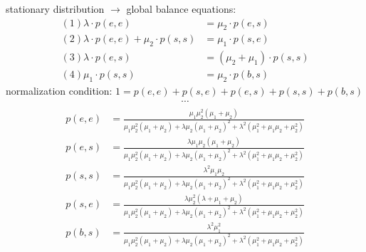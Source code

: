 stationary distribution $\rightarrow$ global balance equations:
\begin{align*}
\left(1\right)\lambda \cdot p\left(e,e\right)&=\mu _{2}\cdot p\left(e,s\right)\\
\left(2\right)\lambda \cdot p\left(e,e\right)+\mu _{2}\cdot p\left(s,s\right)&=\mu _{1}\cdot p\left(s,e\right)\\
\left(3\right)\lambda \cdot p\left(e,s\right)&=\left(\mu _{2}+\mu _{1}\right)\cdot p\left(s,s\right)\\
\left(4\right)\mu _{1}\cdot p\left(s,s\right)&=\mu _{2}\cdot p\left(b,s\right)
\end{align*}
normalization condition: $1=p\left(e,e\right)+p\left(s,e\right)+p\left(e,s\right)+p\left(s,s\right)+p\left(b,s\right)$
\begin{align*}
\cdots
\end{align*}
\begin{align*}
p ( e , e ) &= \frac { \mu _ { 1 } \mu _ { 2 } ^ { 2 } \left( \mu _ { 1 } + \mu _ { 2 } \right) } { \mu _ { 1 } \mu _ { 2 } ^ { 2 } \left( \mu _ { 1 } + \mu _ { 2 } \right) + \lambda \mu _ { 2 } \left( \mu _ { 1 } + \mu _ { 2 } \right) ^ { 2 } + \lambda ^ { 2 } \left( \mu _ { 1 } ^ { 2 } + \mu _ { 1 } \mu _ { 2 } + \mu _ { 2 } ^ { 2 } \right) }\\
p ( e , s ) &= \frac { \lambda \mu _ { 1 } \mu _ { 2 } \left( \mu _ { 1 } + \mu _ { 2 } \right) } { \mu _ { 1 } \mu _ { 2 } ^ { 2 } \left( \mu _ { 1 } + \mu _ { 2 } \right) + \lambda \mu _ { 2 } \left( \mu _ { 1 } + \mu _ { 2 } \right) ^ { 2 } + \lambda ^ { 2 } \left( \mu _ { 1 } ^ { 2 } + \mu _ { 1 } \mu _ { 2 } + \mu _ { 2 } ^ { 2 } \right) }\\
p ( s , s ) &= \frac { \lambda ^ { 2 } \mu _ { 1 } \mu _ { 2 } } { \mu _ { 1 } \mu _ { 2 } ^ { 2 } \left( \mu _ { 1 } + \mu _ { 2 } \right) + \lambda \mu _ { 2 } \left( \mu _ { 1 } + \mu _ { 2 } \right) ^ { 2 } + \lambda ^ { 2 } \left( \mu _ { 1 } ^ { 2 } + \mu _ { 1 } \mu _ { 2 } + \mu _ { 2 } ^ { 2 } \right) }\\
p ( s , e ) &= \frac { \lambda \mu _ { 2 } ^ { 2 } \left( \lambda + \mu _ { 1 } + \mu _ { 2 } \right) } { \mu _ { 1 } \mu _ { 2 } ^ { 2 } \left( \mu _ { 1 } + \mu _ { 2 } \right) + \lambda \mu _ { 2 } \left( \mu _ { 1 } + \mu _ { 2 } \right) ^ { 2 } + \lambda ^ { 2 } \left( \mu _ { 1 } ^ { 2 } + \mu _ { 1 } \mu _ { 2 } + \mu _ { 2 } ^ { 2 } \right) }\\
p ( b , s ) &= \frac { \lambda ^ { 2 } \mu _ { 1 } ^ { 2 } } { \mu _ { 1 } \mu _ { 2 } ^ { 2 } \left( \mu _ { 1 } + \mu _ { 2 } \right) + \lambda \mu _ { 2 } \left( \mu _ { 1 } + \mu _ { 2 } \right) ^ { 2 } + \lambda ^ { 2 } \left( \mu _ { 1 } ^ { 2 } + \mu _ { 1 } \mu _ { 2 } + \mu _ { 2 } ^ { 2 } \right) }
\end{align*}

